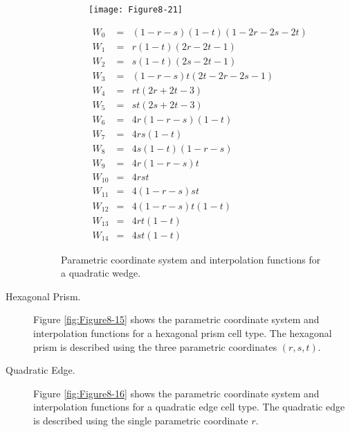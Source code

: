 \begin{description}
    \begin{figure}[!htb]
        \centering
        \begin{subfigure}{0.48\linewidth}
            \centering
            \texttt{[image: Figure8-21]}
            \caption*{}
        \end{subfigure}
        \hfill
        \begin{subfigure}{0.48\linewidth}
            \centering
            \begin{equation*}
            \begin{array}{lll}
            W_0 &=& (1 - r - s)(1 - t)(1 - 2r -2s -2t) \\
            W_1 &=& r(1 - t)(2r - 2t - 1) \\
            W_2 &=& s(1 - t)(2s - 2t - 1) \\
            W_3 &=& (1 - r - s)t(2t - 2r - 2s - 1) \\
            W_4 &=& rt(2r + 2t - 3) \\
            W_5 &=& st(2s + 2t - 3) \\
            W_6 &=& 4r(1 - r - s)(1 - t) \\
            W_7 &=& 4rs(1 - t) \\
            W_8 &=& 4s(1 - t)(1 - r - s) \\
            W_9 &=& 4r(1 - r - s)t \\
            W_{10} &=& 4 rst \\
            W_{11} &=& 4 (1 - r - s)s t\\
            W_{12} &=& 4 (1 - r - s)t(1 - t) \\
            W_{13} &=& 4rt(1 - t) \\
            W_{14} &=& 4st(1 - t)
            \end{array}
            \end{equation*}
        \end{subfigure}%
        \caption{Parametric coordinate system and interpolation functions for a quadratic wedge.}
        \label{fig:Figure8-21}
    \end{figure}

    \item[Hexagonal Prism.] Figure \ref{fig:Figure8-15} shows the parametric coordinate system and interpolation functions for a hexagonal prism cell type. The hexagonal prism is described using the three parametric coordinates $(r,s,t)$.

    \item[Quadratic Edge.] Figure \ref{fig:Figure8-16} shows the parametric coordinate system and interpolation functions for a quadratic edge cell type. The quadratic edge is described using the single parametric coordinate $r$.


\end{description}
